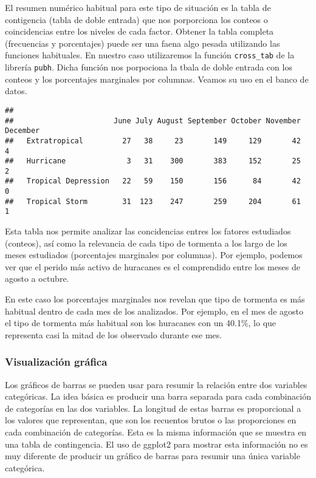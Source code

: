 \documentclass[
]{book}
\newenvironment{Shaded}{\begin{snugshade}}{\end{snugshade}}
\newcommand{\FunctionTok}[1]{\textcolor[rgb]{0.00,0.00,0.00}{#1}}
\newcommand{\NormalTok}[1]{#1}
\newcommand{\SpecialCharTok}[1]{\textcolor[rgb]{0.00,0.00,0.00}{#1}}
\begin{document}
El resumen numérico habitual para este tipo de situación es la tabla de contigencia (tabla de doble entrada) que nos porporciona los conteos o coincidencias entre los niveles de cada factor. Obtener la tabla completa (frecuencias y porcentajes) puede ser una faena algo pesada utilizando las funciones habituales. En nuestro caso utilizaremos la función \texttt{cross\_tab} de la librería \texttt{pubh}. Dicha función nos porpociona la tbala de doble entrada con los conteos y los porcentajes marginales por columnas. Veamos su uso en el banco de datos.

\begin{Shaded}
\end{Shaded}

\begin{verbatim}
##                      
##                       June July August September October November December
##   Extratropical         27   38     23       149     129       42        4
##   Hurricane              3   31    300       383     152       25        2
##   Tropical Depression   22   59    150       156      84       42        0
##   Tropical Storm        31  123    247       259     204       61        1
\end{verbatim}

Esta tabla nos permite analizar las concidencias entres los fatores estudiados (conteos), así como la relevancia de cada tipo de tormenta a los largo de los meses estudiados (porcentajes marginales por columnas). Por ejemplo, podemos ver que el perido más activo de huracanes es el comprendido entre los meses de agosto a octubre.

En este caso los porcentajes marginales nos revelan que tipo de tormenta es más habitual dentro de cada mes de los analizados. Por ejemplo, en el mes de agosto el tipo de tormenta más habitual son los huracanes con un 40.1\%, lo que representa casi la mitad de los observado durante ese mes.

\hypertarget{visualizaciuxf3n-gruxe1fica-2}{%
\subsubsection{Visualización gráfica}\label{visualizaciuxf3n-gruxe1fica-2}}

Los gráficos de barras se pueden usar para resumir la relación entre dos variables categóricas. La idea básica es producir una barra separada para cada combinación de categorías en las dos variables. La longitud de estas barras es proporcional a los valores que representan, que son los recuentos brutos o las proporciones en cada combinación de categorías. Esta es la misma información que se muestra en una tabla de contingencia. El uso de ggplot2 para mostrar esta información no es muy diferente de producir un gráfico de barras para resumir una única variable categórica.
\end{document}
